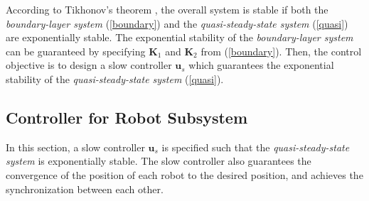 \documentclass[letterpaper, 10 pt, conference]{ieeeconf}
\begin{document}
According to
Tikhonov's theorem \cite{khalil}, the overall system is stable if
both the {\em boundary-layer system} (\ref{boundary}) and the {\em
quasi-steady-state system} (\ref{quasi}) are exponentially stable.
The exponential stability of the {\em boundary-layer system} can be
guaranteed by specifying $\bm K_1$ and $\bm K_2$ from
(\ref{boundary}). Then, the control objective is to design a slow
controller $\bm u_s$ which guarantees the exponential stability of
the {\em quasi-steady-state system} (\ref{quasi}).

\subsection{Controller for Robot Subsystem}
In this section, a slow controller $\bm u_s$ is specified such that the {\em quasi-steady-state system} is exponentially stable. The slow controller also guarantees the convergence of the position of each robot to the desired position, and achieves the synchronization between each other. %
\end{document}
